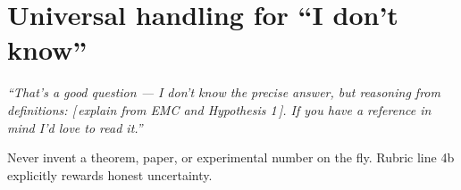 \documentclass[10pt,a4paper]{article}
\begin{document}
\section{Universal handling for ``I don't know''}

\textit{``That's a good question --- I don't know the precise answer, but reasoning from definitions: [\,explain from EMC and Hypothesis 1\,]. If you have a reference in mind I'd love to read it.''}

Never invent a theorem, paper, or experimental number on the fly. Rubric line 4b explicitly rewards honest uncertainty.
\end{document}
